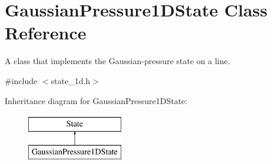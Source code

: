 \hypertarget{classGaussianPressure1DState}{\section{Gaussian\-Pressure1\-D\-State Class Reference}
\label{classGaussianPressure1DState}
}


A class that implements the Gaussian-\/pressure state on a line.  




{\ttfamily \#include $<$state\-\_\-1d.\-h$>$}

Inheritance diagram for Gaussian\-Pressure1\-D\-State\-:\begin{figure}[H]
\begin{center}
\leavevmode
\includegraphics[height=2.000000cm]{classGaussianPressure1DState}
\end{center}
\end{figure}
